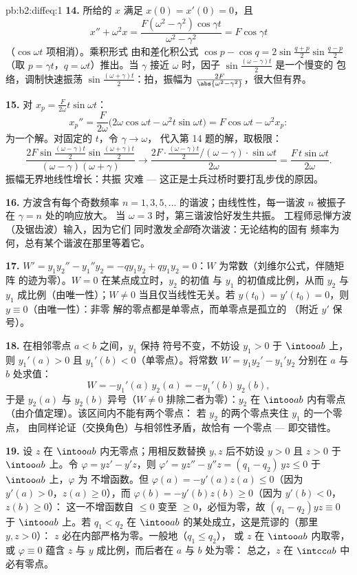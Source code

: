 \begin{solution}{pb:b2:diffeq:1}
\textbf{14.} 所给的 $x$ 满足 $x(0) = x'(0) = 0$，且
\[
x'' + \omega^2 x = \frac{F(\omega^2 -
\gamma^2)\cos\gamma t}{\omega^2 - \gamma^2} = F\cos\gamma t
\]
（$\cos\omega t$ 项相消）。乘积形式
由和差化积公式 $\cos p - \cos q = 2\sin\frac{q+p}{2}\sin\frac{q-p}2$
（取 $p = \gamma t$，$q = \omega t$）推出。当 $\gamma$ 接近
$\omega$ 时，因子 $\sin\frac{(\omega-\gamma)t}2$ 是一个慢变的
包络，调制快速振荡
$\sin\frac{(\omega+\gamma)t}2$：拍，振幅为
$\frac{2F}{\abs{\omega^2-\gamma^2}}$，很大但有界。

\textbf{15.} 对 $x_p = \frac{F}{2\omega}t\sin\omega t$：
\[
x_p'' = \frac{F}{2\omega}\bigl(2\omega\cos\omega t -
\omega^2t\sin\omega t\bigr)
= F\cos\omega t - \omega^2x_p :
\]
为一个解。对固定的 $t$，令 $\gamma \to \omega$，
代入第 14 题的解，取极限：
\[
\frac{2F\sin\frac{(\omega-\gamma)t}2
\sin\frac{(\omega+\gamma)t}{2}}
{(\omega-\gamma)(\omega+\gamma)}
\longrightarrow
\frac{2F\cdot\frac{(\omega-\gamma)t}2\big/(\omega-\gamma)
\cdot\sin\omega t}{2\omega}
= \frac{F\,t\sin\omega t}{2\omega} .
\]
振幅无界地线性增长：共振
灾难 --- 这正是士兵过桥时要打乱步伐的原因。

\textbf{16.} 方波含有每个奇数频率
$n = 1, 3, 5, \dots$ 的谐波；由线性性，每一谐波
$n$ 被振子在 $\gamma = n$ 处的响应放大。
当 $\omega = 3$ 时，第三谐波恰好发生共振。
工程师忌惮方波（及锯齿波）输入，因为它们
同时激发\emph{全部}奇次谐波：无论结构的固有
频率为何，总有某个谐波在那里等着它。

\textbf{17.} $W' = y_1y_2'' - y_1''y_2 = -qy_1y_2 + qy_1y_2 =
0$：$W$ 为常数（刘维尔公式，伴随矩阵
的迹为零）。$W = 0$ 在某点成立时，$y_2$ 的初值
与 $y_1$ 的初值成比例，从而 $y_2$ 与
$y_1$ 成比例（由唯一性）；$W \neq 0$ 当且仅当线性无关。若 $y(t_0) =
y'(t_0) = 0$，则 $y \equiv 0$（由唯一性）：非零
解的零点都是单零点，而单零点是孤立的
（附近 $y'$ 保号）。

\textbf{18.} 在相邻零点 $a < b$ 之间，$y_1$ 保持
符号不变，不妨设 $y_1 > 0$ 于 $\intoo ab$ 上，则 $y_1'(a) > 0$ 且
$y_1'(b) < 0$（单零点）。将常数 $W =
y_1y_2' - y_1'y_2$ 分别在 $a$ 与 $b$ 处求值：
\[
W = -y_1'(a)\,y_2(a) = -y_1'(b)\,y_2(b) ,
\]
于是 $y_2(a)$ 与 $y_2(b)$ 异号（$W \neq 0$
排除二者为零）：$y_2$ 在 $\intoo ab$ 内有零点
（由介值定理）。该区间内不能有两个零点：
若 $y_2$ 的两个零点夹住 $y_1$ 的一个零点，
由同样论证（交换角色）与相邻性矛盾，故恰有
一个零点 --- 即交错性。

\textbf{19.} 设 $z$ 在 $\intoo ab$ 内无零点；用相反数替换
$y, z$ 后不妨设 $y > 0$ 且 $z > 0$ 于
$\intoo ab$ 上。令 $\varphi = yz' - y'z$，则 $\varphi' = yz'' -
y''z = (q_1 - q_2)\,yz \leq 0$ 于 $\intoo ab$ 上，$\varphi$ 为
不增函数。但 $\varphi(a) = -y'(a)z(a) \leq 0$（因为
$y'(a) > 0$，$z(a) \geq 0$），而 $\varphi(b) = -y'(b)z(b) \geq
0$（因为 $y'(b) < 0$，$z(b) \geq 0$）：
这一不增函数自 $\leq 0$ 变至 $\geq 0$，必恒为零，故
$(q_1 - q_2)yz \equiv 0$ 于 $\intoo ab$ 上。若 $q_1 < q_2$
在 $\intoo ab$ 的某处成立，这是荒谬的（那里 $y, z > 0$）：
$z$ 必在内部严格为零。一般地（$q_1 \leq q_2$），
或 $z$ 在 $\intoo ab$ 内取零，或 $\varphi \equiv 0$
蕴含 $z$ 与 $y$ 成比例，而后者在 $a$ 与 $b$ 处为零：
总之，$z$ 在 $\intcc ab$ 中必有零点。


\end{solution}
